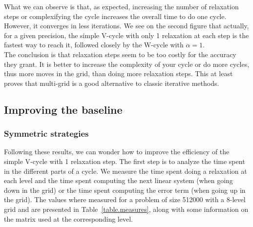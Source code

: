 \documentclass[sigplan]{acmart}
\begin{document}
What we can observe is that, as expected, increasing the number of relaxation steps or complexifying the cycle increases the overall time to do one cycle. However, it converges in less iterations.
We see on the second figure that actually, for a given precision, the simple V-cycle with only 1 relaxation at each step is the fastest way to reach it, followed closely by the W-cycle with $\alpha=1$.\\
The conclusion is that relaxation steps seem to be too costly for the accuracy they grant. It is better to increase the complexity of your cycle or do more cycles, thus more moves in the grid, than doing more relaxation steps. This at least proves
that multi-grid is a good alternative to classic iterative methods.

\subsection{Improving the baseline}

\subsubsection{Symmetric strategies}
Following these results, we can wonder how to improve the efficiency of the simple V-cycle with 1 relaxation step.
The first step is to analyze the time spent in the different parts of a cycle. We measure the time spent doing a relaxation at each level and the time spent computing the next linear system
(when going down in the grid) or the time spent computing the error term (when going up in the grid). The values where measured for a problem of size 512000 with a 8-level grid and are presented
in Table~\ref{table.measures}, along with some information on the matrix used at the corresponding level.
\end{document}
